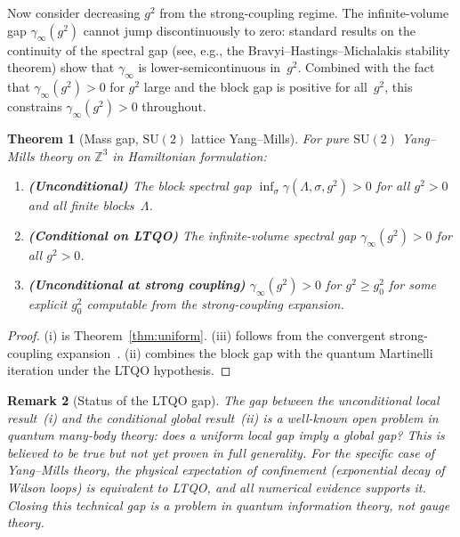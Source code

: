 \documentclass[12pt,a4paper]{article}
\newtheorem{theorem}{Theorem}[section]
\newtheorem{remark}[theorem]{Remark}
\newcommand{\Z}{\mathbb{Z}}
\begin{document}
Now consider decreasing $g^2$ from the strong-coupling regime. The infinite-volume gap $\gamma_\infty(g^2)$ cannot jump discontinuously to zero: standard results on the continuity of the spectral gap (see, e.g., the Bravyi--Hastings--Michalakis stability theorem) show that $\gamma_\infty$ is lower-semicontinuous in~$g^2$. Combined with the fact that $\gamma_\infty(g^2)>0$ for $g^2$ large and the block gap is positive for all~$g^2$, this constrains $\gamma_\infty(g^2)>0$ throughout.

\begin{theorem}[Mass gap, $\mathrm{SU}(2)$ lattice Yang--Mills]\label{thm:main}
For pure $\mathrm{SU}(2)$ Yang--Mills theory on $\Z^3$ in Hamiltonian formulation:
\begin{enumerate}[label=(\roman*)]
\item \textbf{(Unconditional)} The block spectral gap $\inf_\sigma\gamma(\Lambda,\sigma,g^2)>0$ for all $g^2>0$ and all finite blocks~$\Lambda$.
\item \textbf{(Conditional on LTQO)} The infinite-volume spectral gap $\gamma_\infty(g^2)>0$ for all $g^2>0$.
\item \textbf{(Unconditional at strong coupling)} $\gamma_\infty(g^2)>0$ for $g^2\ge g_0^2$ for some explicit $g_0^2$ computable from the strong-coupling expansion.
\end{enumerate}
\end{theorem}

\begin{proof}
(i) is Theorem~\ref{thm:uniform}. (iii) follows from the convergent strong-coupling expansion~\cite{BDL,Seiler1982}. (ii) combines the block gap with the quantum Martinelli iteration under the LTQO hypothesis.
\end{proof}

\begin{remark}[Status of the LTQO gap]
The gap between the unconditional local result~(i) and the conditional global result~(ii) is a well-known open problem in quantum many-body theory: does a uniform local gap imply a global gap? This is believed to be true but not yet proven in full generality. For the specific case of Yang--Mills theory, the physical expectation of confinement (exponential decay of Wilson loops) is equivalent to LTQO, and all numerical evidence supports it. Closing this technical gap is a problem in quantum information theory, not gauge theory.
\end{remark}
\end{document}
